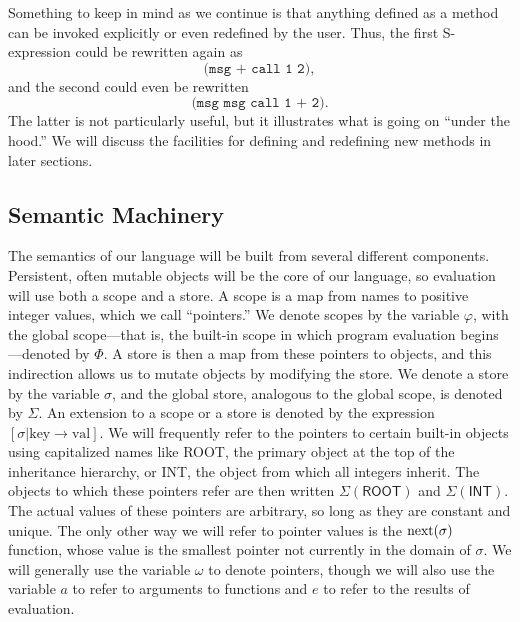 \documentclass[twocolumn]{article}
\begin{document}
Something to keep in mind as we continue is that anything defined as a
method can be invoked explicitly or even redefined by the user. Thus,
the first S-expression could be rewritten again as
\[ \texttt{(msg + call 1 2)}, \]
and the second could even be rewritten
\[ \texttt{(msg msg call 1 + 2)}. \] The latter is not particularly
useful, but it illustrates what is going on ``under the hood.'' We
will discuss the facilities for defining and redefining new methods in
later sections.

\subsection*{Semantic Machinery}
The semantics of our language will be built from several different
components. Persistent, often mutable objects will be the core of our
language, so evaluation will use both a scope and a store. A scope is
a map from names to positive integer values, which we call
``pointers.'' We denote scopes by the variable $\varphi$, with the
global scope---that is, the built-in scope in which program evaluation
begins---denoted by $\Phi$. A store is then a map from these pointers
to objects, and this indirection allows us to mutate objects by
modifying the store. We denote a store by the variable $\sigma$, and
the global store, analogous to the global scope, is denoted by
$\Sigma$. An extension to a scope or a store is denoted by the
expression $[\sigma|\text{key}\rightarrow\text{val}]$. We will
frequently refer to the pointers to certain built-in objects using
capitalized names like \textsf{ROOT}, the primary object at the top of
the inheritance hierarchy, or \textsf{INT}, the object from which all
integers inherit. The objects to which these pointers refer are then
written $\Sigma(\mathsf{ROOT})$ and $\Sigma(\mathsf{INT})$. The actual
values of these pointers are arbitrary, so long as they are constant
and unique. The only other way we will refer to pointer values is the
$\operatorname{next}(\sigma)$ function, whose value is the smallest pointer not
currently in the domain of $\sigma$. We will generally use the
variable $\omega$ to denote pointers, though we will also use the
variable $a$ to refer to arguments to functions and $e$ to refer to
the results of evaluation.
\end{document}
